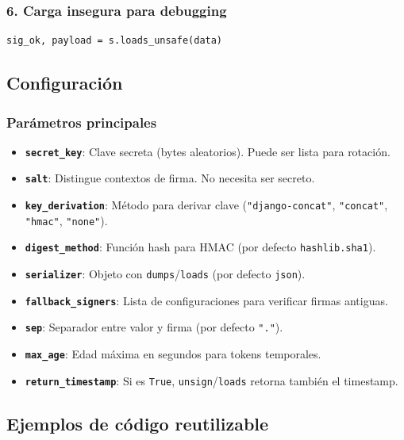\documentclass[11pt,a4paper]{article}
\begin{document}
\subsubsection*{6. Carga insegura para debugging}


\begin{lstlisting}
sig_ok, payload = s.loads_unsafe(data)
\end{lstlisting}


\subsection*{Configuración}


\subsubsection*{Parámetros principales}


\begin{itemize}[leftmargin=*,topsep=2pt,itemsep=1pt]
  \item \textbf{\texttt{secret\_key}}: Clave secreta (bytes aleatorios). Puede ser lista para rotación.
  \item \textbf{\texttt{salt}}: Distingue contextos de firma. No necesita ser secreto.
  \item \textbf{\texttt{key\_derivation}}: Método para derivar clave (\texttt{"django-concat"}, \texttt{"concat"}, \texttt{"hmac"}, \texttt{"none"}).
  \item \textbf{\texttt{digest\_method}}: Función hash para HMAC (por defecto \texttt{hashlib.sha1}).
  \item \textbf{\texttt{serializer}}: Objeto con \texttt{dumps}/\texttt{loads} (por defecto \texttt{json}).
  \item \textbf{\texttt{fallback\_signers}}: Lista de configuraciones para verificar firmas antiguas.
  \item \textbf{\texttt{sep}}: Separador entre valor y firma (por defecto \texttt{"."}).
  \item \textbf{\texttt{max\_age}}: Edad máxima en segundos para tokens temporales.
  \item \textbf{\texttt{return\_timestamp}}: Si es \texttt{True}, \texttt{unsign}/\texttt{loads} retorna también el timestamp.
\end{itemize}


\subsection*{Ejemplos de código reutilizable}
\end{document}
